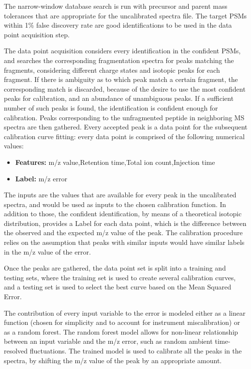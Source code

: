 \documentclass{article}
\begin{document}
The narrow-window database search is run with precursor and parent mass tolerances that are appropriate for the uncalibrated spectra file. The target PSMs within 1\% false discovery rate are good identifications to be used in the data point acquisition step. 

The data point acquisition considers every identification in the confident PSMs, and searches the corresponding fragmentation spectra for peaks matching the fragments, considering different charge states and isotopic peaks for each fragment. If there is ambiguity as to which peak match a certain fragment, the corresponding match is discarded, because of the desire to use the most confident peaks for calibration, and an abundance of unambiguous peaks. If a sufficient number of such peaks is found, the identification is confident enough for calibration. Peaks corresponding to the unfragmented peptide in neighboring MS spectra are then gathered. Every accepted peak is a data point for the subsequent calibration curve fitting: every data point is comprised of the following numerical values:

\begin{itemize}
\item \textbf{Features:} m/z value,Retention time,Total ion count,Injection time
\item \textbf{Label:} m/z error
\end{itemize}

The inputs are the values that are available for every peak in the uncalibrated spectra, and would be used as inputs to the chosen calibration function. In addition to those, the confident identification, by means of a theoretical isotopic distribution, provides a Label for each data point, which is the difference between the observed and the expected m/z value of the peak. The calibration procedure relies on the assumption that peaks with similar inputs would have similar labels in the m/z value of the error.

Once the peaks are gathered, the data point set is split into a training and testing sets, where the training set is used to create several calibration curves, and a testing set is used to select the best curve based on the Mean Squared Error.

The contribution of every input variable to the error is modeled either as a linear function (chosen for simplicity and to account for instrument miscalibration) or as a random forest. The random forest model allows for non-linear relationship between an input variable and the m/z error, such as random ambient time-resolved fluctuations. The trained model is used to calibrate all the peaks in the spectra, by shifting the m/z value of the peak by an appropriate amount.
\end{document}
